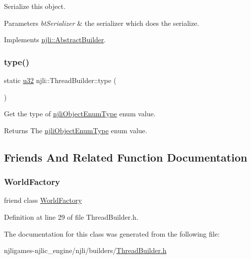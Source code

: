 Serialize this object.


\begin{DoxyParams}{Parameters}
{\em bt\+Serializer} & the serializer which does the serialize. \\
\hline
\end{DoxyParams}


Implements \mbox{\hyperlink{classnjli_1_1_abstract_builder_ab66b774e02ccb9da554c9aab7fa6d981}{njli\+::\+Abstract\+Builder}}.

\mbox{\label{classnjli_1_1_thread_builder_a648198257fe14369e1868a420e1bab47}} 
\subsubsection{\texorpdfstring{type()}{type()}}
{\footnotesize\ttfamily static \mbox{\hyperlink{_util_8h_a10e94b422ef0c20dcdec20d31a1f5049}{u32}} njli\+::\+Thread\+Builder\+::type (\begin{DoxyParamCaption}{ }\end{DoxyParamCaption})\hspace{0.3cm}{\ttfamily [static]}}

Get the type of \mbox{\hyperlink{namespacenjli_a6d56d4fbaf89fcf3e3d32839df05b444}{njli\+Object\+Enum\+Type}} enum value.

\begin{DoxyReturn}{Returns}
The \mbox{\hyperlink{namespacenjli_a6d56d4fbaf89fcf3e3d32839df05b444}{njli\+Object\+Enum\+Type}} enum value. 
\end{DoxyReturn}


\subsection{Friends And Related Function Documentation}
\mbox{\label{classnjli_1_1_thread_builder_acb96ebb09abe8f2a37a915a842babfac}} 
\subsubsection{\texorpdfstring{World\+Factory}{WorldFactory}}
{\footnotesize\ttfamily friend class \mbox{\hyperlink{classnjli_1_1_world_factory}{World\+Factory}}\hspace{0.3cm}{\ttfamily [friend]}}



Definition at line 29 of file Thread\+Builder.\+h.



The documentation for this class was generated from the following file\+:\begin{DoxyCompactItemize}
\item 
njligames-\/njlic\+\_\+engine/njli/builders/\mbox{\hyperlink{_thread_builder_8h}{Thread\+Builder.\+h}}\end{DoxyCompactItemize}
